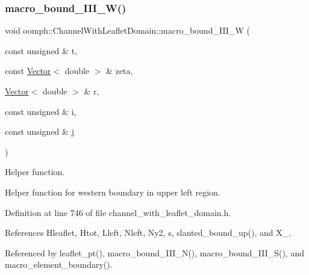 \subsubsection{\texorpdfstring{macro\+\_\+bound\+\_\+\+I\+I\+I\+\_\+\+W()}{macro\_bound\_III\_W()}}
{\footnotesize\ttfamily void oomph\+::\+Channel\+With\+Leaflet\+Domain\+::macro\+\_\+bound\+\_\+\+I\+I\+I\+\_\+W (\begin{DoxyParamCaption}\item[{const unsigned \&}]{t,  }\item[{const \hyperlink{classoomph_1_1Vector}{Vector}$<$ double $>$ \&}]{zeta,  }\item[{\hyperlink{classoomph_1_1Vector}{Vector}$<$ double $>$ \&}]{r,  }\item[{const unsigned \&}]{i,  }\item[{const unsigned \&}]{j }\end{DoxyParamCaption})\hspace{0.3cm}{\ttfamily [protected]}}



Helper function. 

Helper function for western boundary in upper left region. 

Definition at line 746 of file channel\+\_\+with\+\_\+leaflet\+\_\+domain.\+h.



References Hleaflet, Htot, Lleft, Nleft, Ny2, s, slanted\+\_\+bound\+\_\+up(), and X\+\_.



Referenced by leaflet\+\_\+pt(), macro\+\_\+bound\+\_\+\+I\+I\+I\+\_\+\+N(), macro\+\_\+bound\+\_\+\+I\+I\+I\+\_\+\+S(), and macro\+\_\+element\+\_\+boundary().

\mbox{\label{classoomph_1_1ChannelWithLeafletDomain_a16c8d718f5da2e6d9d73fe0455bacc0c}} 
